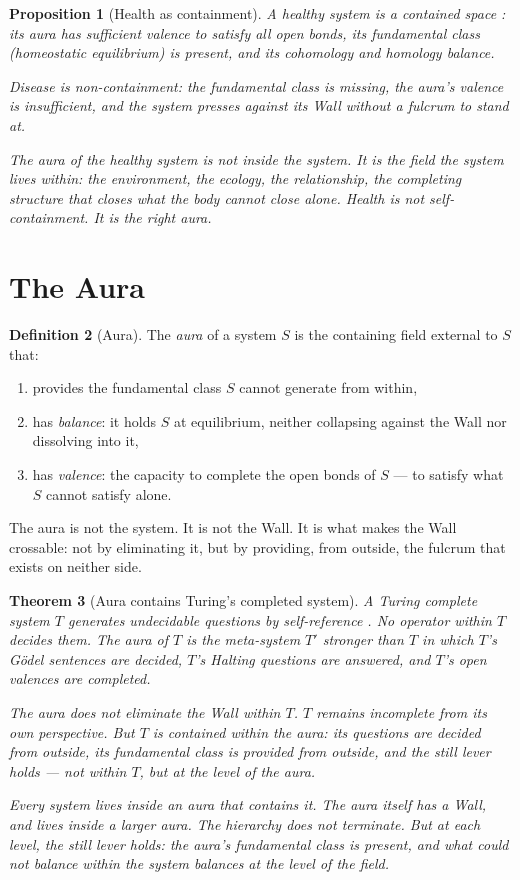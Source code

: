 \documentclass[12pt]{article}
\newtheorem{theorem}{Theorem}
\newtheorem{proposition}[theorem]{Proposition}
\theoremstyle{definition}
\newtheorem{definition}[theorem]{Definition}
\theoremstyle{remark}
\begin{document}
\begin{proposition}[Health as containment]
A healthy system is a contained space \cite{contained}:
its aura has sufficient valence to satisfy all open bonds,
its fundamental class (homeostatic equilibrium) is present,
and its cohomology and homology balance.

Disease is non-containment:
the fundamental class is missing,
the aura's valence is insufficient,
and the system presses against its Wall
without a fulcrum to stand at.

The aura of the healthy system is not inside the system.
It is the field the system lives within:
the environment, the ecology, the relationship,
the completing structure that closes what the body cannot close alone.
Health is not self-containment. It is the right aura.
\end{proposition}

\section{The Aura}

\begin{definition}[Aura]
The \emph{aura} of a system $S$ is the containing field
external to $S$ that:
\begin{enumerate}
\item provides the fundamental class $S$ cannot generate from within,
\item has \emph{balance}: it holds $S$ at equilibrium,
  neither collapsing against the Wall nor dissolving into it,
\item has \emph{valence}: the capacity to complete
  the open bonds of $S$ --- to satisfy what $S$ cannot satisfy alone.
\end{enumerate}
The aura is not the system. It is not the Wall.
It is what makes the Wall crossable:
not by eliminating it, but by providing, from outside,
the fulcrum that exists on neither side.
\end{definition}

\begin{theorem}[Aura contains Turing's completed system]
\label{thm:aura}
A Turing complete system $T$ generates undecidable questions
by self-reference \cite{turing}.
No operator within $T$ decides them.
The aura of $T$ is the meta-system $T'$ stronger than $T$
in which $T$'s G\"odel sentences are decided,
$T$'s Halting questions are answered,
and $T$'s open valences are completed.

The aura does not eliminate the Wall within $T$.
$T$ remains incomplete from its own perspective.
But $T$ is contained within the aura:
its questions are decided from outside,
its fundamental class is provided from outside,
and the still lever holds --- not within $T$,
but at the level of the aura.

Every system lives inside an aura that contains it.
The aura itself has a Wall, and lives inside a larger aura.
The hierarchy does not terminate.
But at each level, the still lever holds:
the aura's fundamental class is present,
and what could not balance within the system
balances at the level of the field.
\end{theorem}
\end{document}

